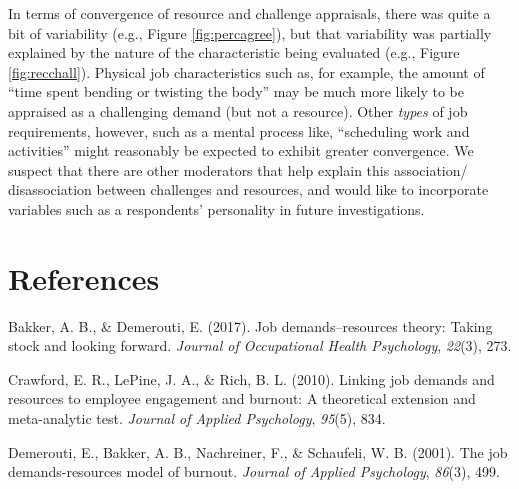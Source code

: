 \documentclass[
  man]{apa6}
\newlength{\cslhangindent}
\newlength{\cslentryspacingunit} %
\newenvironment{CSLReferences}[2] %
 {%
  \setlength{\parindent}{0pt}
  \ifodd #1
  \let\oldpar\par
  \def\par{\hangindent=\cslhangindent\oldpar}
  \fi
  \setlength{\parskip}{#2\cslentryspacingunit}
 }%
 {}
\begin{document}
In terms of convergence of resource and challenge appraisals, there was quite a bit of variability (e.g., Figure \ref{fig:percagree}), but that variability was partially explained by the nature of the characteristic being evaluated (e.g., Figure \ref{fig:recchall}). Physical job characteristics such as, for example, the amount of ``time spent bending or twisting the body'' may be much more likely to be appraised as a challenging demand (but not a resource). Other \emph{types} of job requirements, however, such as a mental process like, ``scheduling work and activities'' might reasonably be expected to exhibit greater convergence. We suspect that there are other moderators that help explain this association/ disassociation between challenges and resources, and would like to incorporate variables such as a respondents' personality in future investigations.

\hypertarget{references}{%
\section*{References}\label{references}}

\hypertarget{refs}{}
\begin{CSLReferences}{1}{0}
\leavevmode{}%
Bakker, A. B., \& Demerouti, E. (2017). Job demands--resources theory: Taking stock and looking forward. \emph{Journal of Occupational Health Psychology}, \emph{22}(3), 273.

\leavevmode{}%
Crawford, E. R., LePine, J. A., \& Rich, B. L. (2010). Linking job demands and resources to employee engagement and burnout: A theoretical extension and meta-analytic test. \emph{Journal of Applied Psychology}, \emph{95}(5), 834.

\leavevmode{}%
Demerouti, E., Bakker, A. B., Nachreiner, F., \& Schaufeli, W. B. (2001). The job demands-resources model of burnout. \emph{Journal of Applied Psychology}, \emph{86}(3), 499.

\end{CSLReferences}
\end{document}
